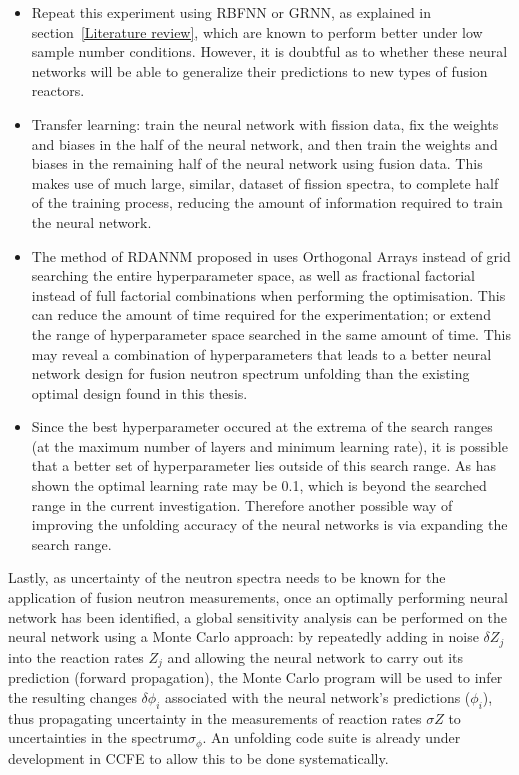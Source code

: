 \documentclass[a4paper, 12pt]{article}
\begin{document}
\begin{itemize}
    \item Repeat this experiment using RBFNN or GRNN, as explained in section~\ref{Literature review}, which are known to perform better under low sample number conditions. However, it is doubtful as to whether these neural networks will be able to generalize their predictions to new types of fusion reactors.
    \item Transfer learning\cite{TransferLearning}: train the neural network with fission data, fix the weights and biases in the half of the neural network, and then train the weights and biases in the remaining half of the neural network using fusion data. This makes use of much large, similar, dataset of fission spectra, to complete half of the training process, reducing the amount of information required to train the neural network.
    \item The method of RDANNM proposed in \cite{RDANNM} uses Orthogonal Arrays instead of grid searching the entire hyperparameter space, as well as fractional factorial instead of full factorial combinations when performing the optimisation. This can reduce the amount of time required for the experimentation; or extend the range of hyperparameter space searched in the same amount of time. This may reveal a combination of hyperparameters that leads to a better neural network design for fusion neutron spectrum unfolding than the existing optimal design found in this thesis.
	\item Since the best hyperparameter occured at the extrema of the search ranges (at the maximum number of layers and minimum learning rate), it is possible that a better set of hyperparameter lies outside of this search range. As \cite{Rodrigues-UnfoldingCompuerCodeBasedOnANN} has shown the optimal learning rate may be 0.1, which is beyond the searched range in the current investigation. Therefore another possible way of improving the unfolding accuracy of the neural networks is via expanding the search range.
\end{itemize}

    Lastly, as uncertainty of the neutron spectra needs to be known for the application of fusion neutron measurements, once an optimally performing neural network has been identified, a global sensitivity analysis can be performed on the neural network using a Monte Carlo approach: by repeatedly adding in noise $\delta Z_j$ into the reaction rates $Z_j$ and allowing the neural network to carry out its prediction (forward propagation), the Monte Carlo program will be used to infer the resulting changes $\delta \phi_i$ associated with the neural network's predictions ($\phi_i$), thus propagating uncertainty in the measurements of reaction rates $\sigma{Z}$ to uncertainties in the spectrum$\sigma_{\phi}$. An unfolding code suite is already under development in CCFE to allow this to be done systematically.
\end{document}
